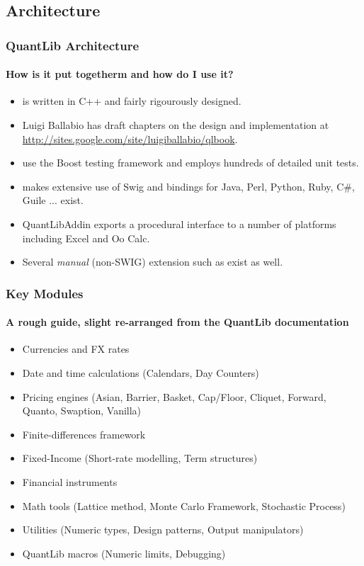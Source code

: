 \documentclass[compress]{beamer}
\begin{document}
\subsection{Architecture}
\begin{frame}
  \frametitle{QuantLib Architecture}
  \framesubtitle{How is it put togetherm and how do I use it?}
  \begin{itemize}
  \item \QL is written in C++ and fairly rigourously designed. 
  \item Luigi Ballabio has draft chapters on the \QL design and
    implementation at \url{http://sites.google.com/site/luigiballabio/qlbook}.
  \item \QL use the Boost testing framework and employs hundreds
    of detailed unit tests. 
  \item \QL makes extensive use of Swig and bindings for Java, Perl, 
    Python, Ruby, C\#, Guile ... exist. 
  \item QuantLibAddin exports a procedural interface to a number of platforms
    including Excel and Oo Calc.
  \item Several \textsl{manual} (non-SWIG) extension such as 
    exist as well.
  \end{itemize}
\end{frame}

\begin{frame}
  \frametitle{Key Modules}
  \framesubtitle{A rough guide, slight re-arranged from the QuantLib documentation}
  \begin{itemize}
  \item Currencies and FX rates
  \item Date and time calculations (Calendars, Day Counters)
  \item Pricing engines (Asian, Barrier, Basket, Cap/Floor, Cliquet, Forward, Quanto,
    Swaption, Vanilla)
  \item Finite-differences framework
  \item Fixed-Income (Short-rate modelling, Term structures)
  \item Financial instruments
  \item Math tools (Lattice method, Monte Carlo Framework, Stochastic Process)
  \item Utilities (Numeric types, Design patterns, Output manipulators)
  \item QuantLib macros (Numeric limits, Debugging)
  \end{itemize}
\end{frame}
\end{document}
